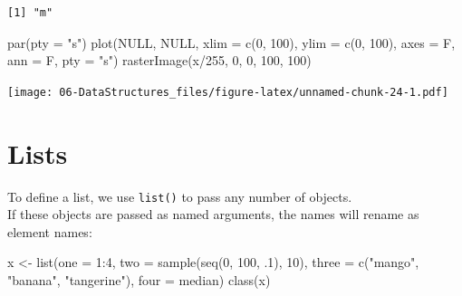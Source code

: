 \documentclass[
]{book}
\newenvironment{Shaded}{\begin{snugshade}}{\end{snugshade}}
\newcommand{\AttributeTok}[1]{\textcolor[rgb]{0.77,0.63,0.00}{#1}}
\newcommand{\ConstantTok}[1]{\textcolor[rgb]{0.00,0.00,0.00}{#1}}
\newcommand{\DecValTok}[1]{\textcolor[rgb]{0.00,0.00,0.81}{#1}}
\newcommand{\FunctionTok}[1]{\textcolor[rgb]{0.00,0.00,0.00}{#1}}
\newcommand{\NormalTok}[1]{#1}
\newcommand{\OtherTok}[1]{\textcolor[rgb]{0.56,0.35,0.01}{#1}}
\newcommand{\SpecialCharTok}[1]{\textcolor[rgb]{0.00,0.00,0.00}{#1}}
\newcommand{\StringTok}[1]{\textcolor[rgb]{0.31,0.60,0.02}{#1}}
\begin{document}
\begin{verbatim}
[1] "m"
\end{verbatim}

\begin{Shaded}
\begin{Highlighting}[]
\FunctionTok{par}\NormalTok{(}\AttributeTok{pty =} \StringTok{"s"}\NormalTok{)}
\FunctionTok{plot}\NormalTok{(}\ConstantTok{NULL}\NormalTok{, }\ConstantTok{NULL}\NormalTok{,}
     \AttributeTok{xlim =} \FunctionTok{c}\NormalTok{(}\DecValTok{0}\NormalTok{, }\DecValTok{100}\NormalTok{), }\AttributeTok{ylim =} \FunctionTok{c}\NormalTok{(}\DecValTok{0}\NormalTok{, }\DecValTok{100}\NormalTok{),}
     \AttributeTok{axes =}\NormalTok{ F, }\AttributeTok{ann =}\NormalTok{ F, }\AttributeTok{pty =} \StringTok{"s"}\NormalTok{)}
\FunctionTok{rasterImage}\NormalTok{(x}\SpecialCharTok{/}\DecValTok{255}\NormalTok{, }\DecValTok{0}\NormalTok{, }\DecValTok{0}\NormalTok{, }\DecValTok{100}\NormalTok{, }\DecValTok{100}\NormalTok{)}
\end{Highlighting}
\end{Shaded}

\texttt{[image: 06-DataStructures\_files/figure-latex/unnamed-chunk-24-1.pdf]}

\hypertarget{lists}{%
\section{Lists}\label{lists}}

To define a list, we use \texttt{list()} to pass any number of objects.\\
If these objects are passed as named arguments, the names will rename as element names:

\begin{Shaded}
\begin{Highlighting}[]
\NormalTok{x }\OtherTok{\textless{}{-}} \FunctionTok{list}\NormalTok{(}\AttributeTok{one =} \DecValTok{1}\SpecialCharTok{:}\DecValTok{4}\NormalTok{,}
          \AttributeTok{two =} \FunctionTok{sample}\NormalTok{(}\FunctionTok{seq}\NormalTok{(}\DecValTok{0}\NormalTok{, }\DecValTok{100}\NormalTok{, .}\DecValTok{1}\NormalTok{), }\DecValTok{10}\NormalTok{),}
          \AttributeTok{three =} \FunctionTok{c}\NormalTok{(}\StringTok{"mango"}\NormalTok{, }\StringTok{"banana"}\NormalTok{, }\StringTok{"tangerine"}\NormalTok{),}
          \AttributeTok{four =}\NormalTok{ median)}
\FunctionTok{class}\NormalTok{(x)}
\end{Highlighting}
\end{Shaded}
\end{document}

